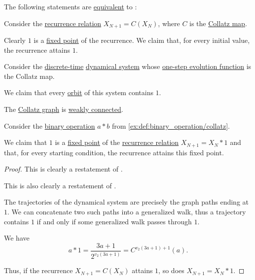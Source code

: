 \begin{theorem}\label{thm:collatz_conjectures_equivalences}
  The following statements are \hyperref[def:logical_theory/equivalent]{equivalent} to :
  \begin{thmenum}[series=thm:axiom_of_choice_equivalences]
     Consider the \hyperref[def:recurrence_relation]{recurrence relation} \( X_{N+1} = C(X_N) \), where \( C \) is the \hyperref[def:collatz_map]{Collatz map}.

    Clearly \( 1 \) is a \hyperref[def:dynamical_system_fixed_point]{fixed point} of the recurrence. We claim that, for every initial value, the recurrence attains \( 1 \).

     Consider the \hyperref[def:discrete_dynamical_system]{discrete-time} \hyperref[def:dynamical_system]{dynamical system} whose \hyperref[def:one_step_evolution_function]{one-step evolution function} is the Collatz map.

    We claim that every \hyperref[def:dynamical_system_trajectory]{orbit} of this system contains \( 1 \).

     The \hyperref[def:collatz_graph]{Collatz graph} is \hyperref[def:graph_connectedness/weak]{weakly connected}.

     Consider the \hyperref[def:operation_on_set]{binary operation} \( a \ast b \) from \cref{ex:def:binary_operation/collatz}.

    We claim that \( 1 \) is a \hyperref[def:dynamical_system_fixed_point]{fixed point} of the \hyperref[def:recurrence_relation]{recurrence relation} \( X_{N+1} = X_N \ast 1 \) and that, for every starting condition, the recurrence attains this fixed point.
  \end{thmenum}
\end{theorem}
\begin{proof}
   This is clearly a restatement of .

   This is also clearly a restatement of .

   The trajectories of the dynamical system are precisely the graph paths ending at \( 1 \). We can concatenate two such paths into a generalized walk, thus a trajectory contains \( 1 \) if and only if some generalized walk passes through \( 1 \).

   We have
  \begin{equation*}
    a \ast 1 = \frac {3a + 1} {2^{v_2(3a + 1)}} = C^{v_2(3a + 1) + 1} (a).
  \end{equation*}

  Thus, if the recurrence \( X_{N+1} = C(X_N) \) attains \( 1 \), so does \( X_{N+1} = X_N \ast 1 \).
\end{proof}

